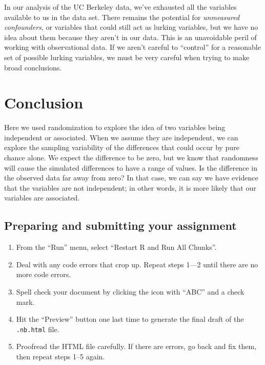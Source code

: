 \documentclass[
]{book}
\providecommand{\tightlist}{%
  \setlength{\itemsep}{0pt}\setlength{\parskip}{0pt}}
\begin{document}
In our analysis of the UC Berkeley data, we've exhausted all the variables available to us in the data set. There remains the potential for \emph{unmeasured confounders}, or variables that could still act as lurking variables, but we have no idea about them because they aren't in our data. This is an unavoidable peril of working with observational data. If we aren't careful to ``control'' for a reasonable set of possible lurking variables, we must be very careful when trying to make broad conclusions.

\hypertarget{randomization2-conclusion}{%
\section{Conclusion}\label{randomization2-conclusion}}

Here we used randomization to explore the idea of two variables being independent or associated. When we assume they are independent, we can explore the sampling variability of the differences that could occur by pure chance alone. We expect the difference to be zero, but we know that randomness will cause the simulated differences to have a range of values. Is the difference in the observed data far away from zero? In that case, we can say we have evidence that the variables are not independent; in other words, it is more likely that our variables are associated.

\hypertarget{randomization2-prep}{%
\subsection{Preparing and submitting your assignment}\label{randomization2-prep}}

\begin{enumerate}
\def\labelenumi{\arabic{enumi}.}
\tightlist
\item
  From the ``Run'' menu, select ``Restart R and Run All Chunks''.
\item
  Deal with any code errors that crop up. Repeat steps 1---2 until there are no more code errors.
\item
  Spell check your document by clicking the icon with ``ABC'' and a check mark.
\item
  Hit the ``Preview'' button one last time to generate the final draft of the \texttt{.nb.html} file.
\item
  Proofread the HTML file carefully. If there are errors, go back and fix them, then repeat steps 1--5 again.
\end{enumerate}
\end{document}
